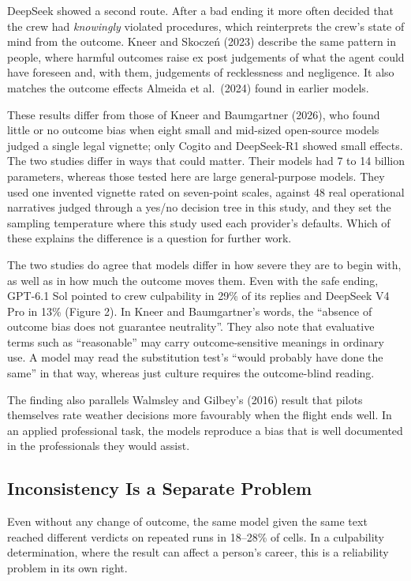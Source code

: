 \documentclass{aer}
\begin{document}
DeepSeek showed a second route. After a bad ending it more often decided that the crew had \emph{knowingly} violated procedures, which reinterprets the crew's state of mind from the outcome. Kneer and Skoczeń (2023) describe the same pattern in people, where harmful outcomes raise ex post judgements of what the agent could have foreseen and, with them, judgements of recklessness and negligence. It also matches the outcome effects Almeida et al.~(2024) found in earlier models.

These results differ from those of Kneer and Baumgartner (2026), who found little or no outcome bias when eight small and mid-sized open-source models judged a single legal vignette; only Cogito and DeepSeek-R1 showed small effects. The two studies differ in ways that could matter. Their models had 7 to 14 billion parameters, whereas those tested here are large general-purpose models. They used one invented vignette rated on seven-point scales, against 48 real operational narratives judged through a yes/no decision tree in this study, and they set the sampling temperature where this study used each provider's defaults. Which of these explains the difference is a question for further work.

The two studies do agree that models differ in how severe they are to begin with, as well as in how much the outcome moves them. Even with the safe ending, GPT-6.1 Sol pointed to crew culpability in 29\% of its replies and DeepSeek V4 Pro in 13\% (Figure 2). In Kneer and Baumgartner's words, the ``absence of outcome bias does not guarantee neutrality''. They also note that evaluative terms such as ``reasonable'' may carry outcome-sensitive meanings in ordinary use. A model may read the substitution test's ``would probably have done the same'' in that way, whereas just culture requires the outcome-blind reading.

The finding also parallels Walmsley and Gilbey's (2016) result that pilots themselves rate weather decisions more favourably when the flight ends well. In an applied professional task, the models reproduce a bias that is well documented in the professionals they would assist.

\hypertarget{inconsistency-is-a-separate-problem}{%
\subsection{Inconsistency Is a Separate Problem}\label{inconsistency-is-a-separate-problem}}

Even without any change of outcome, the same model given the same text reached different verdicts on repeated runs in 18--28\% of cells. In a culpability determination, where the result can affect a person's career, this is a reliability problem in its own right.
\end{document}
